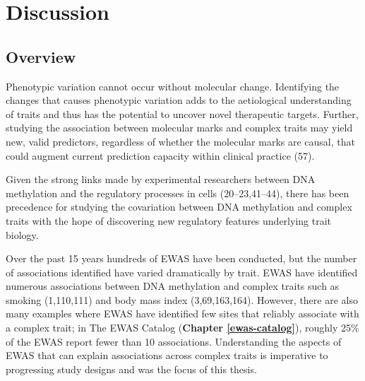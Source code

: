 \documentclass[11pt,oneside]{bristolthesis}
\begin{document}
\hypertarget{discussion-thesis}{%
\chapter{Discussion}\label{discussion-thesis}}

\hypertarget{overview-08}{%
\section{Overview}\label{overview-08}}

Phenotypic variation cannot occur without molecular change. Identifying the changes that causes phenotypic variation adds to the aetiological understanding of traits and thus has the potential to uncover novel therapeutic targets. Further, studying the association between molecular marks and complex traits may yield new, valid predictors, regardless of whether the molecular marks are causal, that could augment current prediction capacity within clinical practice (57).

Given the strong links made by experimental researchers between DNA methylation and the regulatory processes in cells (20--23,41--44), there has been precedence for studying the covariation between DNA methylation and complex traits with the hope of discovering new regulatory features underlying trait biology.

Over the past 15 years hundreds of EWAS have been conducted, but the number of associations identified have varied dramatically by trait. EWAS have identified numerous associations between DNA methylation and complex traits such as smoking (1,110,111) and body mass index (3,69,163,164). However, there are also many examples where EWAS have identified few sites that reliably associate with a complex trait; in The EWAS Catalog (\textbf{Chapter \ref{ewas-catalog}}), roughly 25\% of the EWAS report fewer than 10 associations. Understanding the aspects of EWAS that can explain associations across complex traits is imperative to progressing study designs and was the focus of this thesis.
\end{document}
